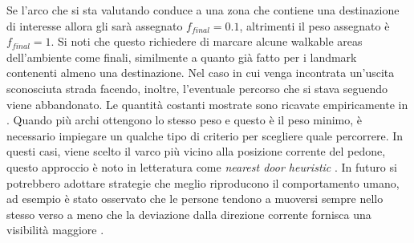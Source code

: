 \documentclass[12pt,a4paper,openright,oneside]{book}
\begin{document}
Se l’arco che si sta valutando conduce a una zona che contiene una destinazione di interesse allora gli sarà assegnato \(f_{final} = 0.1\), altrimenti il peso assegnato è \(f_{final} = 1\). Si noti che questo richiedere di marcare alcune walkable areas dell'ambiente come finali, similmente a quanto già fatto per i landmark contenenti almeno una destinazione. Nel caso in cui venga incontrata un’uscita sconosciuta strada facendo, inoltre, l’eventuale percorso che si stava seguendo viene abbandonato. Le quantità costanti mostrate sono ricavate empiricamente in \cite{Andresen2018}. Quando più archi ottengono lo stesso peso e questo è il peso minimo, è necessario impiegare un qualche tipo di criterio per scegliere quale percorrere. In questi casi, viene scelto il varco più vicino alla posizione corrente del pedone, questo approccio è noto in letteratura come \emph{nearest door heuristic} \cite{Silvers2016, Andresen2016TheIO}. In futuro si potrebbero adottare strategie che meglio riproducono il comportamento umano, ad esempio è stato osservato che le persone tendono a muoversi sempre nello stesso verso a meno che la deviazione dalla direzione corrente fornisca una visibilità maggiore \cite{Peponis1990}.
\end{document}
